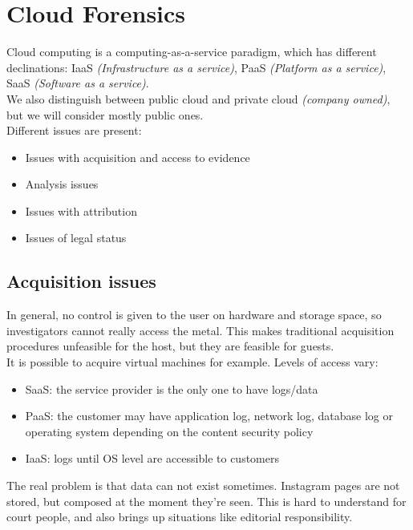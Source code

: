 \chapter{Cloud Forensics}
    Cloud computing is a computing-as-a-service paradigm, which has different declinations: IaaS \textit{(Infrastructure as a service)}, PaaS \textit{(Platform as a service)}, SaaS \textit{(Software as a service)}.\\
    We also distinguish between public cloud and private cloud \textit{(company owned)}, but we will consider mostly public ones.\\
    Different issues are present:
    \begin{itemize}
        \item Issues with acquisition and access to evidence
        \item Analysis issues 
        \item Issues with attribution 
        \item Issues of legal status
    \end{itemize}
    \section{Acquisition issues}
        In general, no control is given to the user on hardware and storage space, so investigators cannot really access the metal. This makes traditional acquisition procedures unfeasible for the host, but they are feasible for guests.\\
        It is possible to acquire virtual machines for example.
        Levels of access vary:
        \begin{itemize}
            \item SaaS: the service provider is the only one to have logs/data 
            \item PaaS: the customer may have application log, network log, database log or operating system depending on the content security policy
            \item IaaS: logs until OS level are accessible to customers
        \end{itemize}
        The real problem is that data can not exist sometimes. Instagram pages are not stored, but composed at the moment they're seen. This is hard to understand for court people, and also brings up situations like editorial responsibility.
